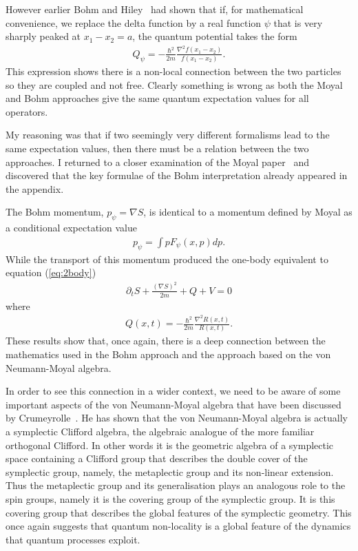 \documentclass[12pt]{article}
\begin{document}
 However earlier Bohm and Hiley~\cite{dbbh75} 
had shown that if, for mathematical convenience, we replace the delta function by a real function $\psi$ that is very sharply peaked at $x_1-x_2=a$, the  quantum potential  takes the form
\begin{eqnarray*}
Q_\psi=-\frac{\hbar^2}{2m}\frac{\nabla^2f(x_1-x_2)}{f(x_1-x_2)}.
\end{eqnarray*}
This expression shows there is a non-local connection between the two particles so they are coupled and not free. Clearly something is wrong as both the Moyal and Bohm approaches give the same quantum expectation values for all operators.

My reasoning was that if two seemingly very different formalisms lead to the same expectation values, then there must be a relation between the two approaches.  I returned to a closer examination of the Moyal paper~\cite{jm49} and discovered that the key formulae of the Bohm interpretation already appeared in the appendix.  

 The Bohm momentum, $p_\psi=\nabla S$, is identical to a momentum defined by Moyal as a conditional expectation value 
\begin{eqnarray}
p_\psi=\int pF_\psi(x,p)dp.
\end{eqnarray}
While the transport of this momentum produced the one-body equivalent to equation (\ref{eq:2body})
\begin{eqnarray}
\partial_t S+\frac{(\nabla S)^2}{2m} + Q+V=0		\label{eq:1body}
\end{eqnarray}
where\begin{eqnarray}
Q(x, t)=-\frac{\hbar^2}{2m}\frac{\nabla^2R(x,t)}{R(x,t)}. \label{eq:1QPE}
\end{eqnarray}
These results show that, once again, there is a deep connection between the mathematics used in the Bohm approach and  the approach based on the von Neumann-Moyal algebra. 

In order to see this connection in a wider context,  we need to be aware of some important aspects of the von Neumann-Moyal algebra that have been discussed by Crumeyrolle~\cite{ac90}.  He 
has shown that the von Neumann-Moyal algebra is actually a symplectic Clifford algebra, the algebraic analogue of the more familiar orthogonal Clifford. In other words it is the geometric algebra of a symplectic space containing a Clifford group that describes the double cover of the symplectic group, namely,  the metaplectic group and its non-linear extension.  Thus the metaplectic group and its generalisation plays an analogous role to the spin groups, namely it is the covering group of the symplectic group.  It is this covering group that describes the global features of the symplectic geometry.  This once again suggests that quantum non-locality is a global feature of the dynamics that quantum processes exploit.
\end{document}

